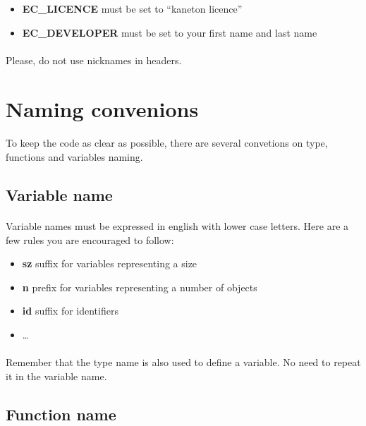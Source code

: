 \begin{itemize}
\item \textbf{EC\_LICENCE} must be set to ``kaneton licence''
\item \textbf{EC\_DEVELOPER} must be set to your first name and last name
\end{itemize}

\paragraph{}
Please, do not use nicknames in headers.

\section*{Naming convenions}

\paragraph{}
To keep the code as clear as possible, there are several convetions on
type, functions and variables naming.

\subsection*{Variable name}

\paragraph{}
Variable  names   must  be  expressed  in  english   with  lower  case
letters. Here are a few rules you are encouraged to follow:

\begin{itemize}
\item \textbf{sz} suffix for variables representing a size
\item \textbf{n} prefix for variables representing a number of objects
\item \textbf{id} suffix for identifiers
\item \ldots
\end{itemize}

\paragraph{}
Remember that the type name is also used to define a variable. No need
to repeat it in the variable name.

\subsection*{Function name}


